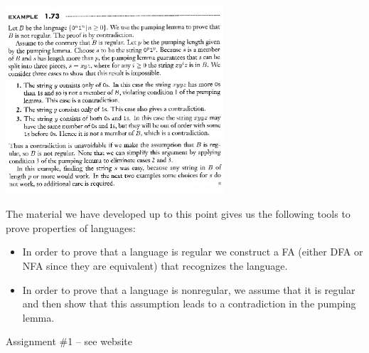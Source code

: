 \documentclass[a4paper,blends,pdf,colorBG,slideColor]{prosper}
\begin{document}
\begin{center}
\includegraphics[height=70mm]{images/proof-pumping.eps}
\end{center}
\es

The material we have developed up to this point gives us the following tools to prove
properties of languages:
\begin{itemize}
\item In order to prove that a language is regular we construct a FA (either DFA or NFA since they are equivalent) that recognizes the language.
\item In order to prove that a language is nonregular, we assume that it is regular
and then show that this assumption leads to a contradiction in the pumping lemma.
\end{itemize}
\es


Assignment \#1 -- see website

\es
\end{document}
